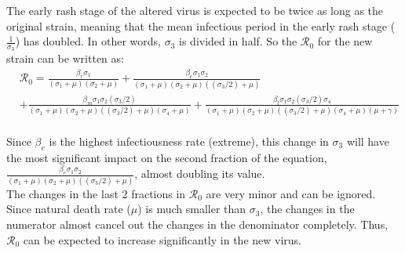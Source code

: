 The early rash stage of the altered virus is expected to be twice as long as the original strain, meaning that the mean infectious period in the early rash stage ($\frac{1}{\sigma_3}$) has doubled. In other words, $\sigma_3$ is divided in half. So the $\mathcal R_0$ for the new strain can be written as: 
\begin{align*}
&\mathcal R_0 = \frac{\beta_r \sigma_{1}}{{\left(\sigma_{1} + \mu\right)} {\left(\sigma_{2} + \mu\right)}} + \frac{\beta_e \sigma_{1} \sigma_{2}}{{\left(\sigma_{1} + \mu\right)} {\left(\sigma_{2} + \mu\right)} {\left((\sigma_{3}/2) + \mu\right)}}\\ 
&+ \frac{\beta_m \sigma_{1} \sigma_{2} (\sigma_{3}/2)}{{\left(\sigma_{1} + \mu\right)} {\left(\sigma_{2} + \mu\right)} {\left((\sigma_{3}/2) + \mu\right)} {\left(\sigma_{4} + \mu\right)}} + \frac{\beta_l \sigma_{1} \sigma_{2} (\sigma_{3}/2) \sigma_{4}}{{\left(\sigma_{1} + \mu\right)} {\left(\sigma_{2} + \mu\right)} {\left((\sigma_{3}/2) + \mu\right)} {\left(\sigma_{4} + \mu\right)} {\left(\mu + \gamma\right)}}
\end{align*}\\
Since $\beta_e$ is the highest infectiousness rate (extreme), this change in $\sigma_3$ will have the most significant impact on the second fraction of the equation, $\frac{\beta_e \sigma_{1} \sigma_{2}}{{\left(\sigma_{1} + \mu\right)} {\left(\sigma_{2} + \mu\right)} {\left((\sigma_{3}/2) + \mu\right)}}$, almost doubling its value. \\ 
The changes in the last 2 fractions in $\mathcal R_0$ are very minor and can be ignored. Since natural death rate ($\mu$) is much smaller than $\sigma_3$, the changes in the numerator almost cancel out the changes in the denominator completely. Thus, $\mathcal R_0$ can be expected to increase significantly in the new virus.
